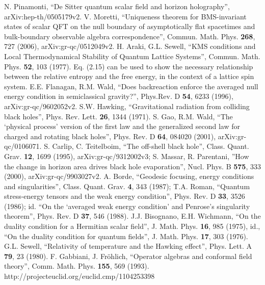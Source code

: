 \documentclass[12pt]{article}
\begin{document}
\begin{thebibliography}{299}
N. Pinamonti, ``De Sitter quantum scalar field and horizon holography'', arXiv:hep-th/0505179v2.
V. Moretti, ``Uniqueness theorem for BMS-invariant states of scalar QFT on the null boundary of asymptotically flat spacetimes and bulk-boundary observable algebra correspondence'', Commun. Math. Phys. \textbf{268}, 727 (2006), arXiv:gr-qc/0512049v2.
H. Araki, G.L. Sewell, ``KMS conditions and Local Thermodynamical Stability of Quantum Lattice Systems'', Commun. Math. Phys. \textbf{52}, 103 (1977).  Eq. (2.15) can be used to show the necessary relationship between the relative entropy and the free energy, in the context of a lattice spin system.
E.E. Flanagan, R.M. Wald, ``Does backreaction enforce the averaged null energy condition in semiclassical gravity?'', Phys.Rev. D \textbf{54}, 6233 (1996), arXiv:gr-qc/9602052v2.
S.W. Hawking, ``Gravitational radiation from colliding black holes'', Phys. Rev. Lett. \textbf{26}, 1344 (1971).
S. Gao, R.M. Wald, ``The `physical process' version of the first law and the generalized second law for charged and rotating black holes'', Phys. Rev. D \textbf{64}, 084020 (2001), arXiv:gr-qc/0106071.
S. Carlip, C. Teitelboim, ``The off-shell black hole'', Class. Quant. Grav. \textbf{12}, 1699 (1995), arXiv:gr-qc/9312002v3; S. Massar, R. Parentani, ''How the change in horizon area drives black hole evaporation'', Nucl. Phys. B \textbf{575}, 333 (2000), arXiv:gr-qc/9903027v2.
A. Borde, ``Geodesic focusing, energy conditions and singularities'', Class. Quant. Grav. \textbf{4}, 343 (1987); T.A. Roman, ``Quantum stress-energy tensors and the weak energy condition'', Phys. Rev. D \textbf{33}, 3526 (1986); id. ``On the `averaged weak energy condition' and Penrose's singularity theorem'', Phys. Rev. D \textbf{37}, 546 (1988).
J.J. Bisognano, E.H. Wichmann, ``On the duality condition for a Hermitian scalar field'', J. Math. Phys. \textbf{16}, 985 (1975), id., ``On the duality condition for quantum fields'', J. Math. Phys. \textbf{17}, 303 (1976).
G.L. Sewell, ``Relativity of temperature and the Hawking effect'', Phys. Lett. A \textbf{79}, 23 (1980).
F. Gabbiani, J. Fr\"{o}hlich, ``Operator algebras and conformal field theory'', Comm. Math. Phys. \textbf{155}, 569 (1993). http://projecteuclid.org/euclid.cmp/1104253398

\end{thebibliography}
\end{document}
